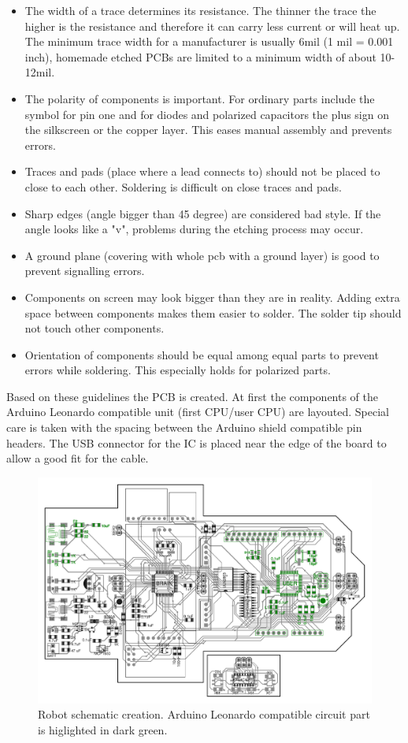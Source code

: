 \documentclass[11pt,a4paper]{article}
\begin{document}
\begin{itemize}
\item The width of a trace determines its resistance. The thinner the trace the higher is the resistance and therefore it can carry less current or will heat up. The minimum trace width for a manufacturer is usually 6mil (1 mil = 0.001 inch), homemade etched PCBs are limited to a minimum width of about 10-12mil.
\item The polarity of components is important. For ordinary parts include the symbol for pin one and for diodes and polarized capacitors the plus sign on the silkscreen or the copper layer. This eases manual assembly and prevents errors.
\item Traces and pads (place where a lead connects to) should not be placed to close to each other. Soldering is difficult on close traces and pads. 
\item Sharp edges (angle bigger than 45 degree) are considered bad style. If the angle looks like a "v", problems during the etching process may occur. 
\item A ground plane (covering with whole pcb with a ground layer) is good to prevent signalling errors. 
\item Components on screen may look bigger than they are in reality. Adding extra space between components makes them easier to solder. The solder tip should not touch other components.
\item Orientation of components should be equal among equal parts to prevent errors while soldering. This especially holds for polarized parts.
\end{itemize}

Based on these guidelines the PCB is created. At first the components of the Arduino Leonardo compatible unit (first CPU/user CPU) are layouted. Special care is taken with the spacing between the Arduino shield compatible pin headers. The USB connector for the IC is placed near the edge of the board to allow a good fit for the cable.

\begin{figure}[H]
  \centering
  \includegraphics[width=\textwidth]{robot_schematic_user.pdf}
  \caption{Robot schematic creation. Arduino Leonardo compatible circuit part is higlighted in dark green.}
\end{figure}
\end{document}
